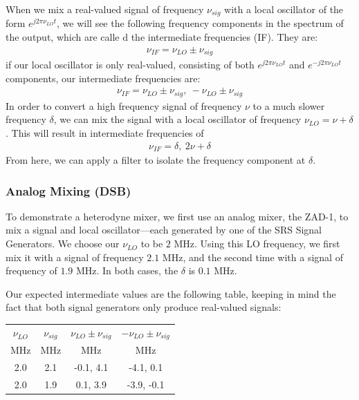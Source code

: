 \documentclass[12pt]{article}
\begin{document}
When we mix a real-valued signal of frequency $\nu_{sig}$ with a local oscillator of the form $e^{j 2\pi \nu_{LO} t}$, we will see the following frequency components in the spectrum of the output, which are calle d the intermediate frequencies (IF). They are:
\begin{eqnarray}
\nu_{IF} = \nu_{LO} \pm \nu_{sig}
\end{eqnarray}
if our local oscillator is only real-valued, consisting of both $e^{j 2\pi \nu_{LO} t}$ and $e^{-j 2\pi \nu_{LO} t}$ components, our intermediate frequencies are:
\begin{eqnarray}
\nu_{IF} = \nu_{LO} \pm \nu_{sig},\ -\nu_{LO} \pm \nu_{sig}
\end{eqnarray}
In order to convert a high frequency signal of frequency $\nu$ to a much slower frequency $\delta$, we can mix the signal with a local oscillator of frequency $\nu_{LO} = \nu + \delta$. This will result in intermediate frequencies of 
\begin{eqnarray}
\nu_{IF} = \delta,\ 2\nu + \delta \label{eq:bands}
\end{eqnarray}
From here, we can apply a filter to isolate the frequency component at $\delta$. 


\subsubsection{Analog Mixing (DSB)}
To demonstrate a heterodyne mixer, we first use an analog mixer, the ZAD-1, to mix a signal and local oscillator---each generated by one of the SRS Signal Generators. We choose our $\nu_{LO}$ to be $2$ MHz. Using this LO frequency, we first mix it with a signal of frequency $2.1$ MHz, and the second time with a signal of frequency of $1.9$ MHz. In both cases, the $\delta$ is $0.1$ MHz. 

Our expected intermediate values are the following table, keeping in mind the fact that both signal generators only produce real-valued signals:

\begin{center}
  \begin{tabular}{c | c | c | c }
    $\nu_{LO}$ & $\nu_{sig}$ & $\nu_{LO} \pm \nu_{sig}$ & $-\nu_{LO} \pm \nu_{sig}$ \\
    MHz & MHz & MHz & MHz \\ \hline
    2.0 & 2.1 & -0.1, 4.1 & -4.1, 0.1 \\
    2.0 & 1.9 & 0.1, 3.9 & -3.9, -0.1 \\
  \end{tabular}\\
\end{center}
\end{document}
